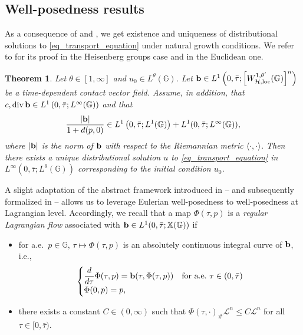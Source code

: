 \documentclass[11pt]{amsart}
\newcommand{\hhh}{{\mathcal{H}}}
\newcommand{\bb}{{\bf {b}}} %
\DeclareMathOperator{\divv}{div}
\theoremstyle{plain}
\newtheorem{theorem}{Theorem}[section]
\theoremstyle{definition}
\theoremstyle{remark}
\numberwithin{equation}{section}
\begin{document}
\subsection{Well-posedness results}\label{section_wpr}
As a consequence of  and , we get existence and uniqueness of distributional solutions to \eqref{eq_transport_equation} under natural growth conditions. We refer to \cite[Theorem 4.7]{dpl1} for its proof in the Heisenberg groups case and \cite[Theorem II.2]{MR1022305} in the Euclidean one.
\begin{theorem}\label{exun_pde_theorem}
Let $\theta \in [1,\infty]$ and $u_0 \in L^\theta(\mathbb{G})$. Let $\bb \in L^1\left(0,\bar{\tau};\left[W^{1,\theta'}_{\hhh,\mathrm{loc}}(\mathbb{G})\right]^n\right)$ be a time-dependent contact vector field. Assume, in addition, that $c, \divv \bb \in L^1\left(0,\bar{\tau};L^\infty(\mathbb{G})\right)$ and that
\begin{equation} \label{eq_growth_condition}
\frac{|\bb|}{1+d(p,0)} \in L^1\left(0,\bar{\tau};L^1(\mathbb{G})\right)+L^1(0,\bar{\tau};L^\infty(\mathbb{G})),
\end{equation} 
where $|\bb|$ is the norm of $\bb$ with respect to the Riemannian metric $\langle\cdot,\cdot\rangle$. Then there exists a unique distributional solution $u$ to \eqref{eq_transport_equation} in $L^\infty\left(0,\bar{\tau};L^\theta(\mathbb{G})\right)$ corresponding to the initial condition $u_0$.
\end{theorem}
A slight adaptation of the abstract framework introduced in \cite{MR2096794} -- and subsequently formalized in \cite{MR2409676,MR3283066} -- allows us to leverage Eulerian well-posedness to well-posedness at Lagrangian level.
Accordingly, we recall that a map $\Phi(\tau,p)$ is a \emph{regular Lagrangian flow} associated with $\bb \in L^1(0,\bar{\tau};\mathbb{X}(\mathbb{G}))$ if
\begin{itemize}
\item[(a)] for a.e.~$p \in \mathbb{G}$, $\tau\mapsto\Phi(\tau,p)$ is an absolutely continuous integral curve of $\bb$, i.e.,
\begin{equation*}
\begin{cases}
\dfrac{d}{d\tau}\Phi(\tau,p)=\bb(\tau,\Phi(\tau,p)) & \text{for a.e.~$\tau \in (0,\bar{\tau})$}\\
\Phi(0,p)=p,
\end{cases}
\end{equation*}
\item[(b)] there exists a constant $C\in (0,\infty)$ such that $\Phi(\tau,\cdot)_\#\mathcal{L}^n\leq C\mathcal{L}^n$ for all $\tau \in [0,\bar\tau)$.
\end{itemize}
\end{document}

